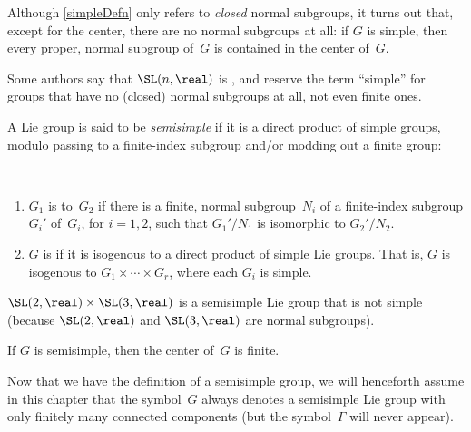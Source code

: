 \begin{rem}
Although \cref{simpleDefn} only refers to
\emph{closed} normal subgroups, it turns out that, except
for the center, there are no normal subgroups at all:
if $G$ is simple, then every proper, normal subgroup of~$G$ is
contained in the center of~$G$.
\end{rem}

\begin{terminology}
 Some authors say that $\SL(n,\real)$ is
, and reserve
the term ``simple'' for groups that have no (closed) normal
subgroups at all, not even finite ones.
 \end{terminology}

A Lie group is said to be \emph{semisimple} if it is a direct product of simple groups, modulo passing to a finite-index subgroup and/or modding out a finite group: 

\begin{defns} \label{SSDefn} \ 
\noprelistbreak
	\begin{enumerate}
	\item $G_1$ is  to~$G_2$ if there is a finite, normal subgroup~$N_i$ of a finite-index subgroup $G_i'$ of~$G_i$, for $i = 1,2$, such that $G_1'/N_1$ is isomorphic to $G_2'/N_2$.
	\item \label{SSDefn-SS}
	$G$ is  if it is
isogenous to a direct product of simple Lie groups. That
is, $G$ is isogenous to $G_1 \times \cdots \times G_r$,
where each $G_i$ is simple.
	\end{enumerate}
 \end{defns}
 
 \begin{eg}
 $\SL(2,\real) \times \SL(3,\real)$ is a semisimple Lie group that is not simple (because $\SL(2,\real)$ and $\SL(3,\real)$ are normal subgroups).
 \end{eg}
 
 \begin{rem}
 If $G$ is semisimple, then the center of~$G$ is finite.
 \end{rem}

\begin{assump} \label{FinCompsAssump}
Now that we have the definition of a semisimple group, we will henceforth assume in this chapter that the symbol~$G$ always denotes a semisimple Lie group with only finitely many connected components (but the symbol~$\Gamma$ will never appear).
\end{assump}

